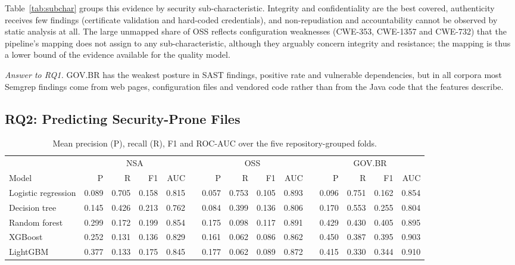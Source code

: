 \documentclass[a4paper,twoside]{article}
\begin{document}
Table~\ref{tab:subchar} groups this evidence by security sub-characteristic. Integrity and confidentiality are the best covered, authenticity receives few findings (certificate validation and hard-coded credentials), and non-repudiation and accountability cannot be observed by static analysis at all. The large unmapped share of OSS reflects configuration weaknesses (CWE-353, CWE-1357 and CWE-732) that the pipeline's mapping does not assign to any sub-characteristic, although they arguably concern integrity and resistance; the mapping is thus a lower bound of the evidence available for the quality model.

\textit{Answer to RQ1.} GOV.BR has the weakest posture in SAST findings, positive rate and vulnerable dependencies, but in all corpora most Semgrep findings come from web pages, configuration files and vendored code rather than from the Java code that the features describe.

\FloatBarrier
\subsection{RQ2: Predicting Security-Prone Files}

\begin{table}[t]
\caption{Mean precision (P), recall (R), F1 and ROC-AUC over the five repository-grouped folds.}\label{tab:ml}
\centering
\footnotesize
\setlength{\tabcolsep}{4pt}
\begin{tabular}{@{}lrrrrcrrrrcrrrr@{}}
\toprule
 & \multicolumn{4}{c}{NSA} & & \multicolumn{4}{c}{OSS} & & \multicolumn{4}{c}{GOV.BR} \\
\cmidrule(lr){2-5}\cmidrule(lr){7-10}\cmidrule(lr){12-15}
Model & P & R & F1 & AUC & & P & R & F1 & AUC & & P & R & F1 & AUC \\
\midrule
Logistic regression & 0.089 & 0.705 & 0.158 & 0.815 & & 0.057 & 0.753 & 0.105 & 0.893 & & 0.096 & 0.751 & 0.162 & 0.854 \\
Decision tree & 0.145 & 0.426 & 0.213 & 0.762 & & 0.084 & 0.399 & 0.136 & 0.806 & & 0.170 & 0.553 & 0.255 & 0.804 \\
Random forest & 0.299 & 0.172 & 0.199 & 0.854 & & 0.175 & 0.098 & 0.117 & 0.891 & & 0.429 & 0.430 & 0.405 & 0.895 \\
XGBoost & 0.252 & 0.131 & 0.136 & 0.829 & & 0.161 & 0.062 & 0.086 & 0.862 & & 0.450 & 0.387 & 0.395 & 0.903 \\
LightGBM & 0.377 & 0.133 & 0.175 & 0.845 & & 0.177 & 0.062 & 0.089 & 0.872 & & 0.415 & 0.330 & 0.344 & 0.910 \\
\bottomrule
\end{tabular}
\end{table}
\end{document}
